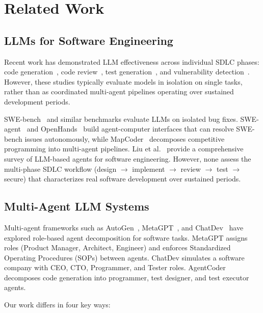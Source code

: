 \documentclass[11pt,a4paper]{article}
\begin{document}
\section{Related Work}

\subsection{LLMs for Software Engineering}

Recent work has demonstrated LLM effectiveness across individual SDLC phases: code generation~\cite{chen2021, li2023starcoder}, code review~\cite{li2022, tufano2022}, test generation~\cite{lemieux2023}, and vulnerability detection~\cite{pearce2023}. However, these studies typically evaluate models in isolation on single tasks, rather than as coordinated multi-agent pipelines operating over sustained development periods.

SWE-bench~\cite{jimenez2024} and similar benchmarks evaluate LLMs on isolated bug fixes. SWE-agent~\cite{yang2024} and OpenHands~\cite{wang2024openhands} build agent-computer interfaces that can resolve SWE-bench issues autonomously, while MapCoder~\cite{islam2024} decomposes competitive programming into multi-agent pipelines. Liu et al.~\cite{liu2024survey} provide a comprehensive survey of LLM-based agents for software engineering. However, none assess the multi-phase SDLC workflow (design $\rightarrow$ implement $\rightarrow$ review $\rightarrow$ test $\rightarrow$ secure) that characterizes real software development over sustained periods.

\subsection{Multi-Agent LLM Systems}

Multi-agent frameworks such as AutoGen~\cite{wu2023}, MetaGPT~\cite{hong2023}, and ChatDev~\cite{qian2023} have explored role-based agent decomposition for software tasks. MetaGPT assigns roles (Product Manager, Architect, Engineer) and enforces Standardized Operating Procedures (SOPs) between agents. ChatDev simulates a software company with CEO, CTO, Programmer, and Tester roles. AgentCoder~\cite{huang2024} decomposes code generation into programmer, test designer, and test executor agents.

Our work differs in four key ways:
\end{document}

